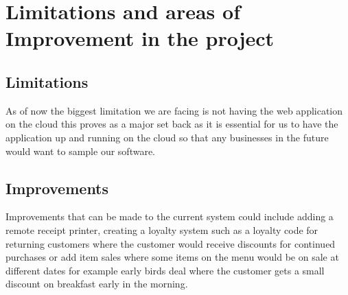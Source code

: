 \section{Limitations and areas of Improvement in the project}

\subsection{Limitations}

As of now the biggest limitation we are facing is not having the web application on the cloud this proves as a major set back as it is essential for us to have the application up and running on the cloud so that any businesses in the future would want to sample our software.

\subsection{Improvements}

Improvements that can be made to the current system could include adding a remote receipt printer, creating a loyalty system such as a loyalty code for returning customers where the customer would receive discounts for continued purchases or add item sales where some items on the menu would be on sale at different dates for example early birds deal where the customer gets a small discount on breakfast early in the morning.
